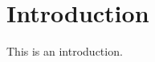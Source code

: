 \documentclass[thesis.tex]{subfile}
\begin{document}
\chapter{Introduction}
This is an introduction.
\end{document}
